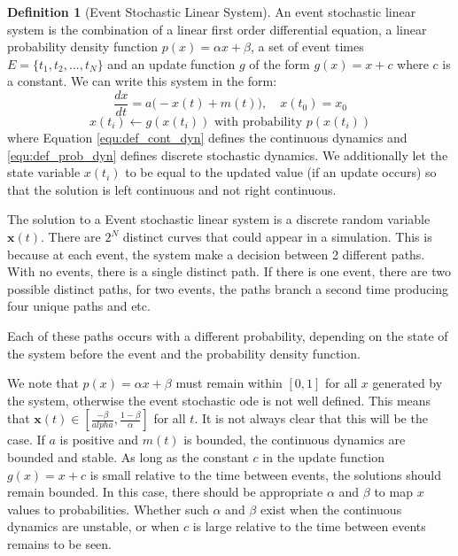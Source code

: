\documentclass{journal}
\theoremstyle{definition}
\newtheorem{definition}{Definition}
\begin{document}
\begin{definition}[Event Stochastic Linear System]\label{def:esls}
An event stochastic linear system is the combination of a linear first order differential equation, a linear probability density function $p(x) = \alpha x + \beta$,  a set of event times $E = \{t_1, t_2, ..., t_N\}$ and an update function $g$ of the form $g(x) = x + c$ where $c$ is a constant. We can write this system in the form:
\begin{equation}\label{equ:def_cont_dyn}
\frac{dx}{dt} = a\big( -x(t) + m(t) \big), \quad x(t_0) = x_0
\end{equation}
\begin{equation}\label{equ:def_prob_dyn}
x(t_i) \leftarrow g(x(t_i)) \text{ with probability } p(x(t_i))
\end{equation}
where Equation \ref{equ:def_cont_dyn} defines the continuous dynamics and \ref{equ:def_prob_dyn} defines discrete stochastic dynamics. We additionally let the state variable $x(t_i)$ to be equal to the updated value (if an update occurs) so that the solution is left continuous and not right continuous.
\end{definition}

The solution to a Event stochastic linear system is a discrete random variable $\mathbf{x}(t)$. There are $2^N$ distinct curves that could appear in a simulation. This is because at each event, the system make a decision between 2 different paths. With no events, there is a single distinct path. If there is one event, there are two possible distinct paths, for two events, the paths branch a second time producing four unique paths and etc.

Each of these paths occurs with a different probability, depending on the state of the system before the event and the probability density function.

We note that $p(x)=\alpha x + \beta$ must remain within $[0, 1]$ for all $x$ generated by the system, otherwise the event stochastic ode is not well defined. This means that $\mathbf{x}(t) \in [\frac{-\beta}{
alpha}, \frac{1-\beta}{\alpha}]$ for all $t$.  It is not always clear that this will be the case. If $a$ is positive and $m(t)$ is bounded, the continuous dynamics are bounded and stable. As long as the constant $c$ in the update function $g(x) = x+c$ is small relative to the time between events, the solutions should remain bounded. In this case, there should be appropriate $\alpha$ and $\beta$ to map $x$ values to probabilities. Whether such $\alpha$ and $\beta$ exist when the continuous dynamics are unstable, or when $c$ is large relative to the time between events remains to be seen.
\end{document}
